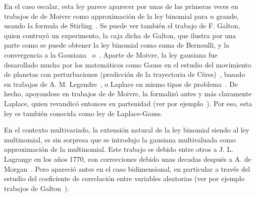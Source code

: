 \label{Sssec:MP:Gaussiana}

En el caso escalar,  esta ley parece aparecer por unas de  las primeras veces en
trabajos de de  Moivre como approximaci\'on de la ley  binomial para $n$ grande,
usando la formula de Stirling~\cite{Moi30, Moi33, Moi56, Pea24, PeaMoi26, Dem33,
  Hal84,  Hal90,  JohKot95:v1, DavEdw01,  Hal06}.   Se  puede  ver tambi\'en  el
trabajo de F.  Galton, quien contruy\'o un experimento, la caja dicha de Galton,
que ilustra  por una parte como  se puede obtener  la ley binomial como  suma de
Bernoulli,  y  la  convergencia  a  la  Gausiana~\cite[Figs.~7-9,  p.~63]{Gal89}
o~\cite[p.~38]{Pea20}.  Aparte de Moivre,  la ley gausiana fue desarollado mucho
por los  matem\'aticos como Gauss en  el estudio del movimiento  de planetas con
perturbaciones (predicci\'on  de la trayectoria  de C\'eres)~\cite{Gau09, Pea24,
  DavEdw01,  Hal06},  basado  en   trabajos  de  A.   M.   Legendre~\cite{Leg05,
  DavEdw01,  Hal06},   o  Laplace   en  mismo  tipos   de  problema~\cite{Lap09,
  Lap09:Supp,  Lap12,   Lap14,  Lap20,  Pea24,  DavEdw01,   Hal06}.   De  hecho,
apoyandose en  trabajos de  de Moivre, la  formaliz\'o antes y  m\'as claramente
Laplace,    quien    revandic\'o     entonces    su    partenidad    (ver    por
ejemplo~\cite{Pea20}).   Por eso,  esta ley  es tambi\'en  conocida como  ley de
Laplace-Gauss.

En el contexto multivariado, la extensi\'on natural de la ley binomial siendo al
ley multinomial, es sin sorpresa  que se introdujo la gausiana multivaluada como
approximaci\'on de la multinomial.  Este trabajo  es debido entre otros a J.  L.
Lagrange en  los a\~nos 1770, con  correcciones debido unas  decadas despu\'es a
A. de  Morgan~\cite{Mor38}. Pero apareci\'o  antes en el caso  bidimensional, en
particular  a  trav\'es  del  estudio  del coeficiente  de  correlaci\'on  entre
variables   aleatorias  (ver   por  ejemplo   trabajos   de  Galton~\cite{Gal77,
  Gal77:Nature, Pea20}).

